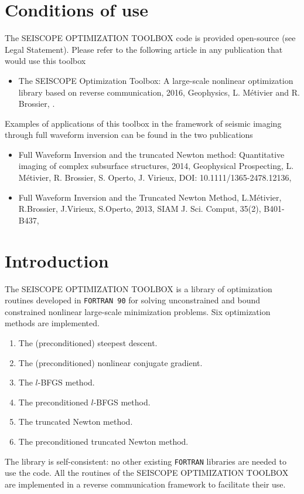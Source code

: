 \documentclass[a4paper,twoside,final,onecolumn,11pt,openright]{article}
\begin{document}
\newpage
\section*{Conditions of use}
 The SEISCOPE OPTIMIZATION TOOLBOX code is provided open-source (see Legal Statement). Please refer to the following article in any publication that would use this toolbox
\begin{itemize}
 \item The SEISCOPE Optimization Toolbox: A large-scale nonlinear optimization library based on reverse communication, 2016, Geophysics, L. M\'etivier and R. Brossier, \citet{Metivier_2015_SOT}.
\end{itemize}

 Examples of applications of this toolbox in the framework of seismic imaging through full waveform inversion can be found in the two publications
\begin{itemize}
 \item Full Waveform Inversion and the truncated Newton method: Quantitative imaging of complex subsurface structures, 2014, Geophysical Prospecting, L. M\'etivier, R. Brossier, S. Operto, J. Virieux, DOI: 10.1111/1365-2478.12136, \citet{Metivier_2014_FWI} 
 \item Full Waveform Inversion and the Truncated Newton Method, L.M\'etivier, R.Brossier, J.Virieux, S.Operto,  2013, SIAM J. Sci. Comput, 35(2), B401-B437, \citet{Metivier_2013_TRU}
\end{itemize}

\newpage
\setcounter{tocdepth}{2}
\tableofcontents

\newpage
\section{Introduction}
The SEISCOPE OPTIMIZATION TOOLBOX is a library of optimization routines developed in \texttt{FORTRAN 90} for solving unconstrained and bound constrained nonlinear large-scale minimization problems. Six optimization methods are implemented.
\begin{enumerate}
 \item The (preconditioned) steepest descent.
 \item The (preconditioned) nonlinear conjugate gradient.
 \item The $l$-BFGS method.
 \item The preconditioned $l$-BFGS method.
 \item The truncated Newton method.
 \item The preconditioned truncated Newton method.
\end{enumerate}
The library is self-consistent: no other existing \texttt{FORTRAN} libraries are needed to use the code. All the routines of the SEISCOPE OPTIMIZATION TOOLBOX are implemented in a reverse communication framework to facilitate their use. 
\end{document}
